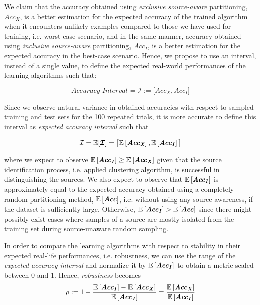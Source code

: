 \documentclass[letterpaper]{article}
\newcommand{\E}[1]{{\mathbb E}\left[ #1 \right]}
\begin{document}
We claim that the accuracy obtained using \textit{exclusive source-aware} partitioning, $Acc_X$, is a better estimation for the expected accuracy of the trained algorithm when it encounters unlikely examples compared to those we have used for training, i.e. worst-case scenario, and in the same manner, accuracy obtained using \textit{inclusive source-aware} partitioning, $Acc_I$, is a better estimation for the expected accuracy in the best-case scenario. Hence, we propose to use an interval, instead of a single value, to define the expected real-world performances of the learning algorithms such that:

\begin{equation}
\textit{Accuracy Interval} = \mathcal{I} := \big[Acc_X, Acc_I\big]
\end{equation}

Since we observe natural variance in obtained accuracies with respect to sampled training and test sets for the 100 repeated trials, it is more accurate to define this interval as \textit{expected accuracy interval} such that

\begin{equation}
\bar{\mathcal{I}} = {\mathbb E}[\text{\boldmath$\mathcal{I}$}] = \big[\E{\textbf{\textit{Acc}}_\textbf{\textit{X}}}, \E{\textbf{\textit{Acc}}_\textbf{\textit{I}}}\big]
\end{equation}

where we expect to observe $\E{\textbf{\textit{Acc}}_\textbf{\textit{I}}} \ge \E{\textbf{\textit{Acc}}_\textbf{\textit{X}}}$ given that the source identification process, i.e. applied clustering algorithm, is successful in distinguishing the sources. We also expect to observe that $\E{\textbf{\textit{Acc}}_\textbf{\textit{I}}}$ is approximately equal to the expected accuracy obtained using a completely random partitioning method, $\E{\textbf{\textit{Acc}}}$, i.e. without using any source awareness, if the dataset is sufficiently large. Otherwise, $\E{\textbf{\textit{Acc}}_\textbf{\textit{I}}} > \E{\textbf{\textit{Acc}}}$
since there might possibly exist cases where samples of a source are mostly isolated from the training set during source-unaware random sampling.

In order to compare the learning algorithms with respect to stability in their expected real-life performances, i.e. robustness, we can use the range of the \textit{expected accuracy interval} and normalize it by $\E{\textbf{\textit{Acc}}_\textbf{\textit{I}}}$ to obtain a metric scaled between 0 and 1. Hence, \textit{robustness} becomes 
\begin{equation}
\rho := 
1-\frac{\E{\textbf{\textit{Acc}}_\textbf{\textit{I}}}-\E{\textbf{\textit{Acc}}_\textbf{\textit{X}}}}{\E{\textbf{\textit{Acc}}_\textbf{\textit{I}}}} = 
\frac{\E{\textbf{\textit{Acc}}_\textbf{\textit{X}}}}{\E{\textbf{\textit{Acc}}_\textbf{\textit{I}}}}
\end{equation}
\end{document}

